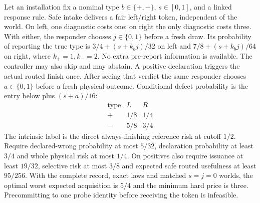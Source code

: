 \begin{theorem}\label{adv:ag3}
Let an installation fix a nominal type \(b\in\{+,-\}\), \(s\in[0,1]\), and a linked response rule. Safe intake delivers a fair left/right token, independent of the world. On left, one diagnostic costs one; on right the only diagnostic costs three. With either, the responder chooses \(j\in\{0,1\}\) before a fresh draw. Its probability of reporting the true type is \(3/4+(s+k_b j)/32\) on left and \(7/8+(s+k_b j)/64\) on right, where \(k_+=1,k_-=2\). No extra pre-report information is available. The controller may also skip and may abstain. A positive declaration triggers the actual routed finish once. After seeing that verdict the same responder chooses \(a\in\{0,1\}\) before a fresh physical outcome. Conditional defect probability is the entry below plus \((s+a)/16\):
\[
\begin{array}{c|cc}\text{type}&L&R\\ \hline
+&1/8&1/4\\ -&5/8&3/4
\end{array}
\]
The intrinsic label is the direct always-finishing reference risk at cutoff \(1/2\). Require declared-wrong probability at most \(5/32\), declaration probability at least \(3/4\) and whole physical risk at most \(1/4\). On positives also require issuance at least \(19/32\), selective risk at most \(3/8\) and expected safe routed usefulness at least \(95/256\). With the complete record, exact laws and matched \(s=j=0\) worlds, the optimal worst expected acquisition is \(5/4\) and the minimum hard price is three. Precommitting to one probe identity before receiving the token is infeasible.
\end{theorem}

